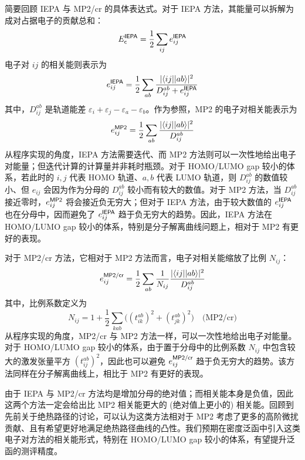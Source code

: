 简要回顾 IEPA 与 MP2/cr 的具体表达式。对于 IEPA 方法，其能量可以拆解为成对占据电子的贡献总和：
\begin{equation}
  E_{\textsf{c}}^{\textsf{IEPA}} = \frac{1}{2} \sum_{ij} e_{ij}^{\textsf{IEPA}}
\end{equation}
电子对 $ij$ 的相关能则表示为
\begin{equation}
  e_{ij}^{\textsf{IEPA}} = \frac{1}{2} \sum_{ab} \frac{|\langle ij || ab \rangle|^2}{D_{ij}^{ab} + e_{ij}^{\textsf{IEPA}}}
\end{equation}
其中，$D_{ij}^{ab}$ 是轨道能差 $\varepsilon_i + \varepsilon_j - \varepsilon_a - \varepsilon_b$。作为参照，MP2 的电子对相关能表示为
\begin{equation}
  e_{ij}^{\textsf{MP2}} = \frac{1}{2} \sum_{ab} \frac{|\langle ij || ab \rangle|^2}{D_{ij}^{ab}}
\end{equation}
从程序实现的角度，IEPA 方法需要迭代、而 MP2 方法则可以一次性地给出电子对能量；但迭代计算的计算量并非耗时瓶颈。对于 HOMO/LUMO gap 较小的体系，若此时的 $i, j$ 代表 HOMO 轨道、$a, b$ 代表 LUMO 轨道，则 $D_{ij}^{ab}$ 的数值较小、但 $e_{ij}$ 会因为作为分母的 $D_{ij}^{ab}$ 较小而有较大的数值。对于 MP2 方法，当 $D_{ij}^{ab}$ 接近零时，$e_{ij}^{\textsf{MP2}}$ 将会接近负无穷大；但对于 IEPA 方法，由于较大数值的 $e_{ij}^{\textsf{IEPA}}$ 也在分母中，因而避免了 $e_{ij}^{\textsf{IEPA}}$ 趋于负无穷大的趋势。因此，IEPA 方法在 HOMO/LUMO gap 较小的体系，特别是分子解离曲线问题上，相对于 MP2 有更好的表现\cite{Zhang-Scheffler.NJP.2016, Zhang-Scheffler.PRL.2016}。

对于 MP2/cr 方法，它相对于 MP2 方法而言，电子对相关能缩放了比例 $N_{ij}$：
\begin{equation}
  \label{eq.2.eij-MP2cr}
  e_{ij}^{\textsf{MP2/cr}} = \frac{1}{2} \sum_{ab} \frac{1}{N_{ij}} \frac{|\langle ij || ab \rangle|^2}{D_{ij}^{ab}}
\end{equation}
其中，比例系数定义为
\begin{equation}
  \label{eq.2.Nij-MP2cr}
  N_{ij} = 1 + \frac{1}{2} \sum_{kab} \big( (t_{ik}^{ab})^2 + (t_{jk}^{ab})^2 \big) \quad \text{(MP2/cr)}
\end{equation}
从程序实现的角度，MP2/cr 与 MP2 方法一样，可以一次性地给出电子对能量。对于 HOMO/LUMO gap 较小的体系，由于置于分母中的比例系数 $N_{ij}$ 中包含较大的激发张量平方 $(t_{ij}^{ab})^2$，因此也可以避免 $e_{ij}^{\textsf{MP2/cr}}$ 趋于负无穷大的趋势。该方法同样在分子解离曲线上，相比于 MP2 有更好的表现\cite{Dykstra-Davidson.IJQC.2000}。

由于 IEPA 与 MP2/cr 方法均是增加分母的绝对值；而相关能本身是负值，因此这两个方法一定会给出比 MP2 相关能更大的 (绝对值上更小的) 相关能。回顾到先前关于绝热路径的讨论，可以认为这类方法相对于 MP2 考虑了更多的高阶微扰贡献、且有希望更好地满足绝热路径曲线的凸性。我们预期在密度泛函中引入这类电子对方法的相关能形式，特别在 HOMO/LUMO gap 较小的体系，有望提升泛函的测评精度。

